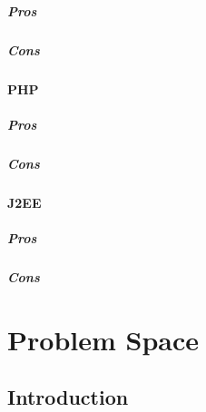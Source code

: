 \documentclass[11pt, openany]{report}
\begin{document}
\paragraph{Pros}
\paragraph{Cons}
\subsubsection{PHP}
\paragraph{Pros}
\paragraph{Cons}

\subsubsection{J2EE}

\paragraph{Pros}
\paragraph{Cons}

\chapter{Problem Space}
\section*{Introduction}

\clearpage
\end{document}
